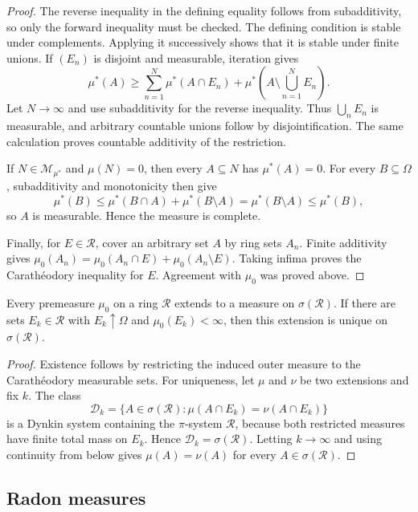 \begin{proof}
The reverse inequality in the defining equality follows from subadditivity,
so only the forward inequality must be checked. The defining condition is
stable under complements. Applying it successively shows that it is stable
under finite unions. If $(E_n)$ is disjoint and measurable, iteration gives
\[
\mu^*(A)\geq
\sum_{n=1}^{N}\mu^*(A\cap E_n)
 +\mu^*\!\left(A\setminus\bigcup_{n=1}^{N}E_n\right).
\]
Let $N\to\infty$ and use subadditivity for the reverse inequality. Thus
$\bigcup_nE_n$ is measurable, and arbitrary countable unions follow by
disjointification. The same calculation proves countable additivity of the
restriction.

If $N\in\mathcal M_{\mu^*}$ and $\mu(N)=0$, then every $A\subseteq N$ has
$\mu^*(A)=0$. For every $B\subseteq\Omega$, subadditivity and monotonicity
then give
\[
\mu^*(B)\leq\mu^*(B\cap A)+\mu^*(B\setminus A)
 =\mu^*(B\setminus A)\leq\mu^*(B),
\]
so $A$ is measurable. Hence the measure is complete.

Finally, for $E\in\mathcal R$, cover an arbitrary set $A$ by ring sets
$A_n$. Finite additivity gives
$\mu_0(A_n)=\mu_0(A_n\cap E)+\mu_0(A_n\setminus E)$. Taking infima proves the
Carath\'eodory inequality for $E$. Agreement with $\mu_0$ was proved above.
\end{proof}

\begin{thm}
Every premeasure $\mu_0$ on a ring $\mathcal R$ extends to a measure on
$\sigma(\mathcal R)$. If there are sets $E_k\in\mathcal R$ with
$E_k\uparrow\Omega$ and $\mu_0(E_k)<\infty$, then this extension is unique on
$\sigma(\mathcal R)$.
\end{thm}

\begin{proof}
Existence follows by restricting the induced outer measure to the
Carath\'eodory measurable sets. For uniqueness, let $\mu$ and $\nu$ be two
extensions and fix $k$. The class
\[
\mathcal D_k=
\{A\in\sigma(\mathcal R):\mu(A\cap E_k)=\nu(A\cap E_k)\}
\]
is a Dynkin system containing the $\pi$-system $\mathcal R$, because both
restricted measures have finite total mass on $E_k$. Hence
$\mathcal D_k=\sigma(\mathcal R)$. Letting $k\to\infty$ and using continuity
from below gives $\mu(A)=\nu(A)$ for every $A\in\sigma(\mathcal R)$.
\end{proof}

\subsection{Radon measures}

